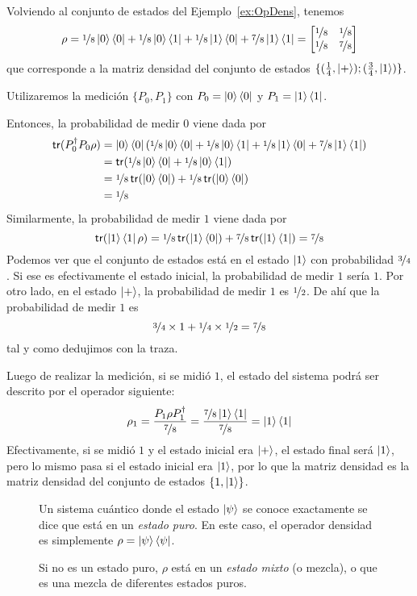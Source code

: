 \begin{ejemplo}
  Volviendo al conjunto de estados del Ejemplo~\ref{ex:OpDens}, tenemos
  \[
    \rho=\nicefrac 18\ket 0\bra 0+\nicefrac 18\ket 0\bra 1+\nicefrac 18\ket
    1\bra 0+\nicefrac 78\ket 1\bra 1=
    \begin{bmatrix}\nicefrac{1}{8}&\nicefrac{1}{8}\\\nicefrac{1}{8}&\nicefrac{7}{8}\end{bmatrix}
  \]
  que corresponde a la matriz densidad del conjunto de estados $\{(\frac 14,\ket+);(\frac 34,\ket 1)\}$.

  Utilizaremos la medición $\{P_0,P_1\}$ con $P_0=\ket 0\bra 0$ y
  $P_1=\ket 1\bra 1$.

  Entonces, la probabilidad de medir $0$ viene dada por
  \begin{align*}
    \mathsf{tr}(P_0^\dagger P_0\rho)
    &=\ket 0\bra 0(\nicefrac 18\ket 0\bra 0+\nicefrac 18\ket 0\bra 1+\nicefrac 18\ket 1\bra 0+\nicefrac 78\ket 1\bra 1)\\
    &=\mathsf{tr}(\nicefrac 18\ket 0\bra 0+\nicefrac 18\ket 0\bra 1)\\
    &=\nicefrac 18\,\mathsf{tr}(\ket 0\bra 0)+\nicefrac 18\,\mathsf{tr}(\ket 0\bra 0)\\
    &=\nicefrac 18
  \end{align*}
  Similarmente, la probabilidad de medir $1$ viene dada por
  \[
    \mathsf{tr}(\ket 1\bra 1\rho)
    =\nicefrac 18\,\mathsf{tr}(\ket 1\bra 0)+\nicefrac 78\,\mathsf{tr}(\ket 1\bra 1)\\
    =\nicefrac 78
  \]
  Podemos ver que el conjunto de estados está en el estado $\ket 1$ con
  probabilidad $\nicefrac 34$. Si ese es efectivamente el estado inicial, la
  probabilidad de medir $1$ sería $1$. Por otro lado, en el estado $\ket +$, la
  probabilidad de medir $1$ es $\nicefrac 12$. De ahí que la probabilidad de
  medir $1$ es
  \[
    \nicefrac 34\times 1+\nicefrac 14\times\nicefrac 12=\nicefrac 78
  \]
  tal y como dedujimos con la traza.

  Luego de realizar la medición, si se midió $1$, el estado del sistema podrá
  ser descrito por el operador siguiente:
  \[
    \rho_1=\frac{P_1\rho P_1^\dagger}{\nicefrac 78} =\frac{\nicefrac 78\ket
      1\bra 1}{\nicefrac 78} =\ket 1\bra 1
  \]
  Efectivamente, si se midió $1$ y el estado inicial era $\ket +$, el estado
  final será $\ket 1$, pero lo mismo pasa si el estado inicial era $\ket 1$, por
  lo que la matriz densidad es la matriz densidad del conjunto de estados
  $\{1,\ket 1\}$.
\end{ejemplo}
\begin{figure}[H]
\begin{definicion}
  Un sistema cuántico donde el estado $\ket\psi$ se conoce
  exactamente se dice que está en un \emph{estado puro}. En este
  caso, el operador densidad es simplemente
  $\rho=\ket\psi\bra\psi$.

  
  Si no es un estado puro, $\rho$ está en un \emph{estado mixto} (o
  mezcla), o que es una mezcla de diferentes estados puros.
\end{definicion}
\end{figure}

